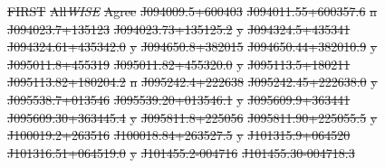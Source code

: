 \documentclass[11pt, a4paper]{book}
\providecommand{\DIFdeltex}[1]{{\protect\color{red}\sout{#1}}}                      %
\providecommand{\DIFdelFL}[1]{\DIFdel{#1}} %
\providecommand{\DIFdel}[1]{\texorpdfstring{\DIFdeltex{#1}}{}} %
\begin{document}
\DIFdelFL{FIRST }%
\DIFdelFL{All}\emph{\DIFdelFL{WISE}} %
\DIFdelFL{Agree}%
\DIFdelFL{J094009.5+600403 }%
\DIFdelFL{J094011.55+600357.6 }%
\DIFdelFL{n}%
\DIFdelFL{J094023.7+135123 }%
\DIFdelFL{J094023.73+135125.2 }%
\DIFdelFL{y}%
\DIFdelFL{J094324.5+435341 }%
\DIFdelFL{J094324.61+435342.0 }%
\DIFdelFL{y}%
\DIFdelFL{J094650.8+382015 }%
\DIFdelFL{J094650.44+382010.9 }%
\DIFdelFL{y}%
\DIFdelFL{J095011.8+455319 }%
\DIFdelFL{J095011.82+455320.0 }%
\DIFdelFL{y}%
\DIFdelFL{J095113.5+180211 }%
\DIFdelFL{J095113.82+180204.2 }%
\DIFdelFL{n}%
\DIFdelFL{J095242.4+222638 }%
\DIFdelFL{J095242.45+222638.0 }%
\DIFdelFL{y}%
\DIFdelFL{J095538.7+013546 }%
\DIFdelFL{J095539.20+013546.1 }%
\DIFdelFL{y}%
\DIFdelFL{J095609.9+363441 }%
\DIFdelFL{J095609.30+363445.4 }%
\DIFdelFL{y}%
\DIFdelFL{J095811.8+225056 }%
\DIFdelFL{J095811.90+225055.5 }%
\DIFdelFL{y}%
\DIFdelFL{J100019.2+263516 }%
\DIFdelFL{J100018.84+263527.5 }%
\DIFdelFL{y}%
\DIFdelFL{J101315.9+064520 }%
\DIFdelFL{J101316.51+064519.0 }%
\DIFdelFL{y}%
\DIFdelFL{J101455.2-004716 }%
\DIFdelFL{J101455.30-004718.3 }%
\end{document}
